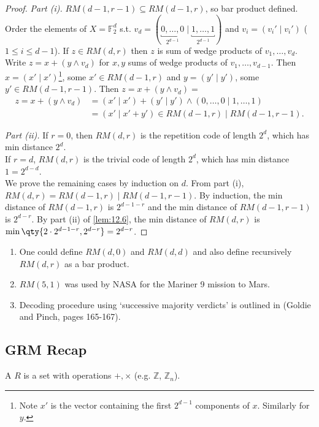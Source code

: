 \begin{proof}
    \emph{Part (i).}
    $RM(d-1, r-1) \subseteq RM(d-1, r)$, so bar product defined.
    Order the elements of $X = \mathbb{F}_2^d$ s.t. $v_d = (\underbracket{0, \dots, 0}_{2^{d-1}} \mid \underbracket{1, \dots, 1}_{2^{d-1}})$ and $v_i = (v_i' \mid v_i')$ ($1 \leq i \leq d - 1$).
    If $z \in RM(d, r)$ then $z$ is sum of wedge products of $v_1, \dots, v_d$.
    Write $z = x + (y \wedge v_d)$ for $x, y$ sums of wedge products of $v_1, \dots, v_{d-1}$.
    Then $x = (x' \mid x')$\footnote{Note $x'$ is the vector containing the first $2^{d-1}$ components of $x$. Similarly for $y$.}, some $x' \in RM(d-1, r)$ and $y = (y' \mid y')$, some $y' \in RM(d-1, r-1)$.
    Then $z = x + (y \wedge v_d) = $
    \begin{align*}
        z = x + (y \wedge v_d) &= (x' \mid x') + (y' \mid y') \wedge (0, \dots, 0 \mid 1, \dots, 1) \\
        &= (x' \mid x' + y') \in RM(d-1, r) \mid RM(d-1, r-1).
    \end{align*}

    \emph{Part (ii).}
    If $r = 0$, then $RM(d,r)$ is the repetition code of length $2^d$, which has min distance $2^d$. \\
    If $r = d$, $RM(d,r)$ is the trivial code of length $2^d$, which has min distance $1 = 2^{d-d}$. \\
    We prove the remaining cases by induction on $d$.
    From part (i), $RM(d,r) = RM(d-1,r) \mid RM(d-1,r-1)$.
    By induction, the min distance of $RM(d-1,r)$ is $2^{d-1-r}$ and the min distance of $RM(d-1,r-1)$ is $2^{d-r}$.
    By part (ii) of \cref{lem:12.6}, the min distance of $RM(d,r)$ is $\min\qty{2\cdot 2^{d-1-r}, 2^{d-r}} = 2^{d-r}$.
\end{proof}

\begin{remark}
    \begin{enumerate}
        \item One could define $RM(d, 0)$ and $RM(d, d)$ and also define recursively $RM(d, r)$ as a bar product.
        \item $RM(5, 1)$ was used by NASA for the Mariner 9 mission to Mars.
        \item Decoding procedure using `successive majority verdicts' is outlined in (Goldie and Pinch, pages 165-167).
    \end{enumerate}
\end{remark}

\subsection{GRM Recap}
\begin{definition}[Ring]
    A  $R$ is a set with operations $+, \times$ (e.g. $\mathbb{Z}$, $\mathbb{Z}_n$).
\end{definition}

